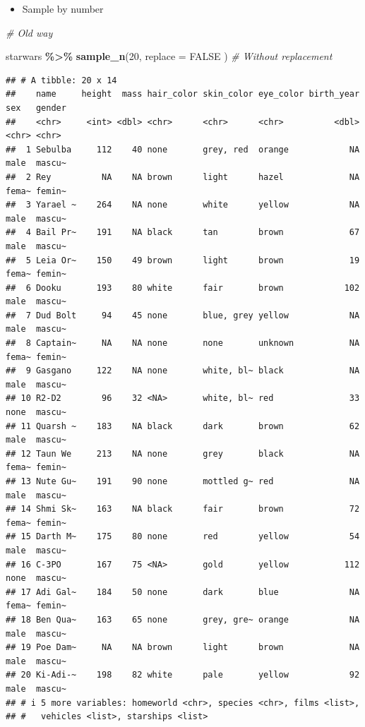 \documentclass[
]{book}
\newenvironment{Shaded}{\begin{snugshade}}{\end{snugshade}}
\newcommand{\AttributeTok}[1]{\textcolor[rgb]{0.13,0.29,0.53}{#1}}
\newcommand{\CommentTok}[1]{\textcolor[rgb]{0.56,0.35,0.01}{\textit{#1}}}
\newcommand{\ConstantTok}[1]{\textcolor[rgb]{0.56,0.35,0.01}{#1}}
\newcommand{\DecValTok}[1]{\textcolor[rgb]{0.00,0.00,0.81}{#1}}
\newcommand{\FunctionTok}[1]{\textcolor[rgb]{0.13,0.29,0.53}{\textbf{#1}}}
\newcommand{\NormalTok}[1]{#1}
\newcommand{\SpecialCharTok}[1]{\textcolor[rgb]{0.81,0.36,0.00}{\textbf{#1}}}
\providecommand{\tightlist}{%
  \setlength{\itemsep}{0pt}\setlength{\parskip}{0pt}}
\begin{document}
\begin{itemize}
\tightlist
\item
  Sample by number
\end{itemize}

\begin{Shaded}
\begin{Highlighting}[]
\CommentTok{\# Old way}

\NormalTok{starwars }\SpecialCharTok{\%\textgreater{}\%}
  \FunctionTok{sample\_n}\NormalTok{(}\DecValTok{20}\NormalTok{,}
    \AttributeTok{replace =} \ConstantTok{FALSE}
\NormalTok{  ) }\CommentTok{\# Without replacement}
\end{Highlighting}
\end{Shaded}

\begin{verbatim}
## # A tibble: 20 x 14
##    name     height  mass hair_color skin_color eye_color birth_year sex   gender
##    <chr>     <int> <dbl> <chr>      <chr>      <chr>          <dbl> <chr> <chr> 
##  1 Sebulba     112    40 none       grey, red  orange            NA male  mascu~
##  2 Rey          NA    NA brown      light      hazel             NA fema~ femin~
##  3 Yarael ~    264    NA none       white      yellow            NA male  mascu~
##  4 Bail Pr~    191    NA black      tan        brown             67 male  mascu~
##  5 Leia Or~    150    49 brown      light      brown             19 fema~ femin~
##  6 Dooku       193    80 white      fair       brown            102 male  mascu~
##  7 Dud Bolt     94    45 none       blue, grey yellow            NA male  mascu~
##  8 Captain~     NA    NA none       none       unknown           NA fema~ femin~
##  9 Gasgano     122    NA none       white, bl~ black             NA male  mascu~
## 10 R2-D2        96    32 <NA>       white, bl~ red               33 none  mascu~
## 11 Quarsh ~    183    NA black      dark       brown             62 male  mascu~
## 12 Taun We     213    NA none       grey       black             NA fema~ femin~
## 13 Nute Gu~    191    90 none       mottled g~ red               NA male  mascu~
## 14 Shmi Sk~    163    NA black      fair       brown             72 fema~ femin~
## 15 Darth M~    175    80 none       red        yellow            54 male  mascu~
## 16 C-3PO       167    75 <NA>       gold       yellow           112 none  mascu~
## 17 Adi Gal~    184    50 none       dark       blue              NA fema~ femin~
## 18 Ben Qua~    163    65 none       grey, gre~ orange            NA male  mascu~
## 19 Poe Dam~     NA    NA brown      light      brown             NA male  mascu~
## 20 Ki-Adi-~    198    82 white      pale       yellow            92 male  mascu~
## # i 5 more variables: homeworld <chr>, species <chr>, films <list>,
## #   vehicles <list>, starships <list>
\end{verbatim}
\end{document}
